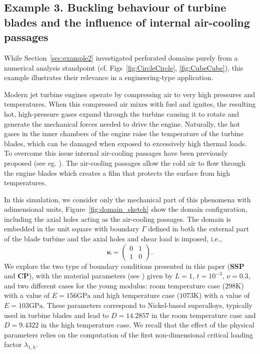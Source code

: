\documentclass[final,reqno]{elsarticle}
\def\bkappa{\boldsymbol{\kappa}}
\begin{document}
\subsection{Example 3. Buckling behaviour of turbine blades and the influence of internal air-cooling passages}
While Section~\ref{sec:example2} investigated perforated domains purely from a numerical analysis standpoint (cf. Figs~\ref{fig:CircleCircle}, \ref{fig:CubeCube}), this example illustrates their relevance in a engineering-type application. 

Modern jet turbine engines operate by compressing air to very high pressures and temperatures. When this compressed air mixes with fuel and ignites, the resulting hot, high-pressure gases expand through the turbine causing it to rotate and generate the mechanical forces needed to drive the engine. Naturally, the hot gases in the inner chambers of the engine raise the temperature of the turbine blades, which can be damaged when exposed to excessively high thermal loads. To overcome this issue internal air-cooling passages have been previously proposed (see eg. \cite{BANG2023123664,GAO20082139}). The air-cooling passages allow the cold air to flow through the engine blades which creates a film that protects the surface from high temperatures. 

In this simulation, we consider only the mechanical part of this phenomena with adimensional units, Figure~\ref{fig:domain_sketch} show the domain configuration, including the axial holes acting as the air-cooling passages. The domain is embedded in the unit square with boundary $\Gamma$ defined in both the external part of the blade turbine and the axial holes and shear load is imposed, i.e.,
$$\bkappa = \begin{pmatrix}
    0 & 1 \\
    1 & 0
\end{pmatrix}.$$
We explore the two type of boundary conditions presented in this paper (\textbf{SSP} and \textbf{CP}), with the material parameters (see \cite{TAKAGI2004348}) given by $L=1$, $t=10^{-3}$, $\nu=0.3$, and two different cases for the young modulus: room temperature case ($298\unit{\K}$) with a value of $E=156\unit{\GPa}$ and high temperature case ($1073\unit{\K}$) with a value of $E=103\unit{\GPa}$. These parameters correspond to Nickel-based superalloys, typically used in turbine blades and lead to $D=14.2857$ in the room temperature case and $D=9.4322$ in the high temperature case. We recall that the effect of the physical parameters relies on the computation of the first non-dimensional critical loading factor $\lambda_{1,h}$.
\end{document}
